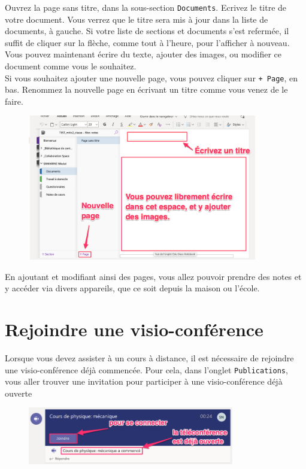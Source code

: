 Ouvrez la page sans titre, dans la sous-section \texttt{Documents}. Ecrivez le titre de votre document. Vous verrez que le titre sera mis à jour dans la liste de documents, à gauche. Si votre liste de sections et documents s'est refermée, il suffit de cliquer sur la flèche, comme tout à l'heure, pour l'afficher à nouveau.\\

Vous pouvez maintenant écrire du texte, ajouter des images, ou modifier ce document comme vous le souhaitez.\\

Si vous souhaitez ajouter une nouvelle page, vous pouvez cliquer sur \texttt{+ Page}, en bas. Renommez la nouvelle page en écrivant un titre comme vous venez de le faire.

\begin{figure}[H]
	\includegraphics[width=10cm]{./images/teams/sous_section_documents_crop}
	\centering
\end{figure}

En ajoutant et modifiant ainsi des pages, vous allez pouvoir prendre des notes et y accéder via divers appareils, que ce soit depuis la maison ou l'école.

\section{Rejoindre une visio-conférence}

Lorsque vous devez assister à un cours à distance, il est nécessaire de rejoindre une visio-conférence déjà commencée. Pour cela, dans l'onglet \texttt{Publications}, vous aller trouver une invitation pour participer à une visio-conférence déjà ouverte

\begin{figure}[H]
\includegraphics[width=9cm]{./images/teams/video1}
\centering
\end{figure}

